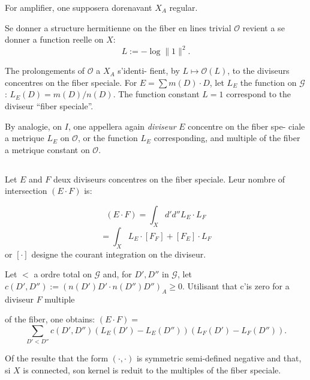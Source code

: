 \documentclass[12pt,a4paper]{article}
\theoremstyle{plain}
\theoremstyle{definition}
\newcommand{\Oo}{\mathscr{O}}
\begin{document}
\smallskip

For amplifier, one supposera dorenavant $X_A$ regular.

\medskip

\begin{minipage}[t]{0.48\textwidth}
Se donner a structure
hermitienne on the fiber
en lines trivial $\Oo$ revient
a se donner a function reelle
on $X$:
\[
L := -\log \|1\|^2 .
\]
\end{minipage}
\hfill
\begin{minipage}[t]{0.48\textwidth}
The prolongements of $\Oo$ a $X_A$ s'identi-
fient, by $L \mapsto \Oo(L)$, to the diviseurs
concentres on the fiber speciale. For
$E = \sum m(D) \cdot D$, let $L_E$ the function
on $\mathcal{G}$: $L_E(D) = m(D)/n(D)$. The function
constant $L = 1$ correspond to the diviseur
``fiber speciale''.
\end{minipage}

\smallskip

By analogie, on $I$, one appellera again \emph{diviseur} $E$ concentre on the fiber spe-
ciale a metrique $L_E$ on $\Oo$, or the function $L_E$ corresponding, and multiple
of the fiber a metrique constant on $\Oo$.

\subsection{}

Let $E$ and $F$ deux diviseurs concentres on the fiber speciale. Leur nombre
of intersection $(E \cdot F)$ is:

\smallskip

\begin{minipage}[t]{0.48\textwidth}
\[
(E \cdot F) = \int_X d'd'' L_E \cdot L_F
\]
\[
= \int_X L_E \cdot [F_F] + [F_E] \cdot L_F
\]
or $[\cdot]$ designe the courant
integration on the diviseur.
\end{minipage}
\hfill
\begin{minipage}[t]{0.48\textwidth}
Let $<$ a ordre total on $\mathcal{G}$ and, for
$D', D''$ in $\mathcal{G}$, let $c(D', D'') :=
(n(D') D' \cdot n(D'') D'')_A \geq 0$. Utilisant that
c'is zero for a diviseur $F$ multiple

of the fiber, one obtains: $(E \cdot F) =$
\[
\sum_{D' < D''} c(D', D'') (L_E(D') - L_E(D'')) (L_F(D') - L_F(D'')) .
\]
\end{minipage}

\smallskip

Of the resulte that the form $(\cdot, \cdot)$ is symmetric semi-defined negative and that, si
$X$ is connected, son kernel is reduit to the multiples of the fiber speciale.
\end{document}

